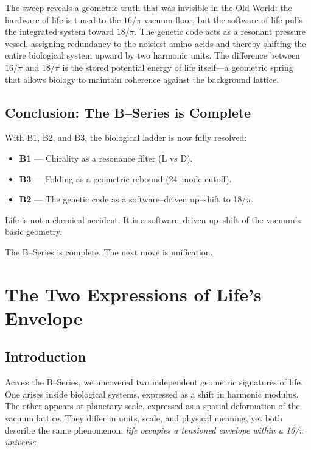 \documentclass[11pt, letterpaper, openany]{book}
\begin{document}
\noindent
The sweep reveals a geometric truth that was invisible in the Old World: the
hardware of life is tuned to the $16/\pi$ vacuum floor, but the software of life
pulls the integrated system toward $18/\pi$. The genetic code acts as a
resonant pressure vessel, assigning redundancy to the noisiest amino acids and
thereby shifting the entire biological system upward by two harmonic units. The
difference between $16/\pi$ and $18/\pi$ is the stored potential energy of life
itself---a geometric spring that allows biology to maintain coherence against
the background lattice.

\section*{Conclusion: The B–Series is Complete}

With B1, B2, and B3, the biological ladder is now fully resolved:

\begin{itemize}
    \item \textbf{B1} — Chirality as a resonance filter (L vs D).
    \item \textbf{B3} — Folding as a geometric rebound (24–mode cutoff).
    \item \textbf{B2} — The genetic code as a software–driven up–shift to 18/$\pi$.
\end{itemize}

Life is not a chemical accident.  
It is a software–driven up–shift of the vacuum’s basic geometry.

The B–Series is complete.  
The next move is unification.


\chapter{The Two Expressions of Life’s Envelope}

\section*{Introduction}

Across the B–Series, we uncovered two independent geometric signatures of life.
One arises inside biological systems, expressed as a shift in harmonic modulus.
The other appears at planetary scale, expressed as a spatial deformation of the
vacuum lattice. They differ in units, scale, and physical meaning, yet both
describe the same phenomenon: \textit{life occupies a tensioned envelope within
a 16/$\pi$ universe}.
\end{document}
